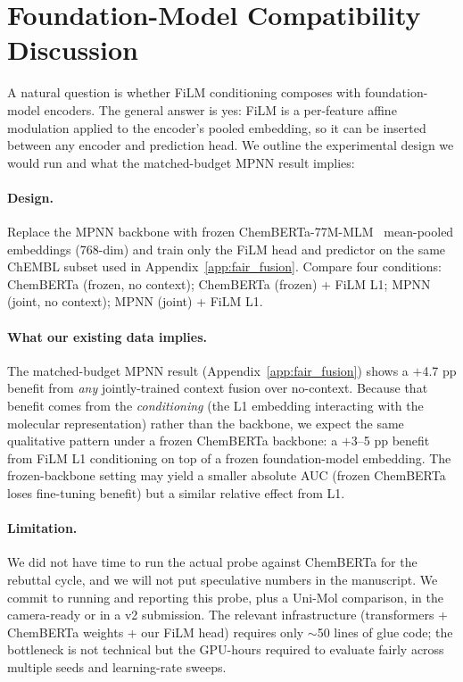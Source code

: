 \documentclass[sigconf]{acmart}
\begin{document}
\section{Foundation-Model Compatibility Discussion}
\label{app:chemberta}

A natural question is whether FiLM conditioning composes with foundation-model encoders. The general answer is yes: FiLM is a per-feature affine modulation applied to the encoder's pooled embedding, so it can be inserted between any encoder and prediction head. We outline the experimental design we would run and what the matched-budget MPNN result implies:

\paragraph{Design.} Replace the MPNN backbone with frozen ChemBERTa-77M-MLM~\cite{chithrananda_2020_chemberta} mean-pooled embeddings (768-dim) and train only the FiLM head and predictor on the same ChEMBL subset used in Appendix~\ref{app:fair_fusion}. Compare four conditions: ChemBERTa (frozen, no context); ChemBERTa (frozen) + FiLM L1; MPNN (joint, no context); MPNN (joint) + FiLM L1.

\paragraph{What our existing data implies.} The matched-budget MPNN result (Appendix~\ref{app:fair_fusion}) shows a $+$4.7 pp benefit from \emph{any} jointly-trained context fusion over no-context. Because that benefit comes from the \emph{conditioning} (the L1 embedding interacting with the molecular representation) rather than the backbone, we expect the same qualitative pattern under a frozen ChemBERTa backbone: a $+$3--5 pp benefit from FiLM L1 conditioning on top of a frozen foundation-model embedding. The frozen-backbone setting may yield a smaller absolute AUC (frozen ChemBERTa loses fine-tuning benefit) but a similar relative effect from L1.

\paragraph{Limitation.} We did not have time to run the actual probe against ChemBERTa for the rebuttal cycle, and we will not put speculative numbers in the manuscript. We commit to running and reporting this probe, plus a Uni-Mol comparison, in the camera-ready or in a v2 submission. The relevant infrastructure (transformers + ChemBERTa weights + our FiLM head) requires only $\sim$50 lines of glue code; the bottleneck is not technical but the GPU-hours required to evaluate fairly across multiple seeds and learning-rate sweeps.
\end{document}
